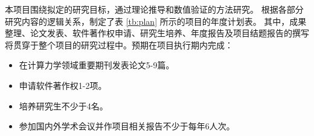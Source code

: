 
本项目围绕拟定的研究目标，通过理论推导和数值验证的方法研究\titlecn。
根据各部分研究内容的逻辑关系，制定了表 \ref{tb:plan} 所示的项目的年度计划表。
其中，成果整理、论文发表、软件著作权申请、研究生培养、年度报告及项目结题报告的撰写将贯穿于整个项目的研究过程中。预期在项目执行期内完成：
\begin{itemize}[left=24pt]
    \item 在计算力学领域重要期刊发表论文5-9篇。
    \item 申请软件著作权1-2项。
    \item 培养研究生不少于4名。
    \item 参加国内外学术会议并作项目相关报告不少于每年6人次。
\end{itemize}

